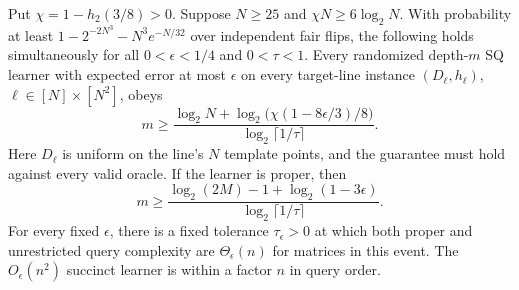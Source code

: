 \begin{theorem}\label{thm:query-lower}
Put $\chi=1-h_2(3/8)>0$. Suppose $N\ge25$ and $\chi N\ge6\log_2N$. With probability at least $1-2^{-2N^3}-N^3e^{-N/32}$ over independent fair flips, the following holds simultaneously for all $0<\epsilon<1/4$ and $0<\tau<1$. Every randomized depth-$m$ SQ learner with expected error at most $\epsilon$ on every target-line instance $(D_\ell,h_\ell)$, $\ell\in[N]\times[N^2]$, obeys
\[
 m\ge\frac{\log_2N+\log_2\!\bigl(\chi(1-8\epsilon/3)/8\bigr)}
 {\log_2\lceil1/\tau\rceil}.
\]
Here $D_\ell$ is uniform on the line's $N$ template points, and the guarantee must hold against every valid oracle. If the learner is proper, then
\[
 m\ge\frac{\log_2(2M)-1+\log_2(1-3\epsilon)}
 {\log_2\lceil1/\tau\rceil}.
\]
For every fixed $\epsilon$, there is a fixed tolerance $\tau_\epsilon>0$ at which both proper and unrestricted query complexity are $\Theta_\epsilon(n)$ for matrices in this event. The $O_\epsilon(n^2)$ succinct learner is within a factor $n$ in query order.
\end{theorem}

